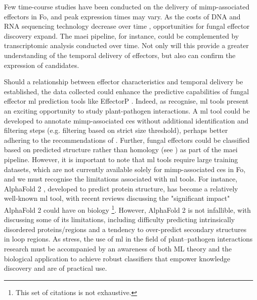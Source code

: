 Few time-course studies have been conducted on the delivery of \ac{mimp}-associated effectors in \ac{Fo}, and peak expression times may vary. As the costs of DNA and RNA sequencing technology decrease over time \parencite{Chan2005, Hu2021}, opportunities for fungal effector discovery expand. The \ac{maei} pipeline, for instance, could be complemented by transcriptomic analysis conducted over time. Not only will this provide a greater understanding of the temporal delivery of effectors, but also can confirm the expression of candidates.

Should a relationship between effector characteristics and temporal delivery be established, the data collected could enhance the predictive capabilities of fungal effector \ac{ml} prediction tools like EffectorP \parencite{Sperschneider2022}. Indeed, as \textcite{Sperschneider2020} recognise, \ac{ml} tools present an exciting opportunity to study plant-pathogen interactions. A \ac{ml} tool could be developed to annotate \ac{mimp}-associated \acp{ce} without additional identification and filtering steps (e.g. filtering based on strict size threshold), perhaps better adhering to the recommendations of \textcite{Sperschneider2015, LoPresti2015, Todd2022}. Further, fungal effectors could be classified based on predicted structure rather than homology (see \textcite{Seong2023}) as part of the \ac{maei} pipeline. However, it is important to note that \ac{ml} tools require large training datasets, which are not currently available solely for \ac{mimp}-associated \acp{ce} in \ac{Fo}, and we must recognise the limitations associated with \ac{ml} tools. For instance, AlphaFold 2 \parencite{Jumper2021}, developed to predict protein structure, has become a relatively well-known \ac{ml} tool, with recent reviews discussing the "significant impact" \parencite{Yang2023} AlphaFold 2 could have on biology \parencite{Skolnick2021, Marcu2022, Varadi2023}\footnote{This set of citations is not exhaustive.}. However, AlphaFold 2 is not infallible, with \textcite{Bertoline2023} discussing some of its limitations, including difficulty predicting intrinsically disordered proteins/regions and a tendency to over-predict secondary structures in loop regions. As \textcite{Sperschneider2020} stress, the use of \ac{ml} in the field of plant–pathogen interactions research must be accompanied by an awareness of both ML theory and the biological application to achieve robust classifiers that empower knowledge discovery and are of practical use. 


